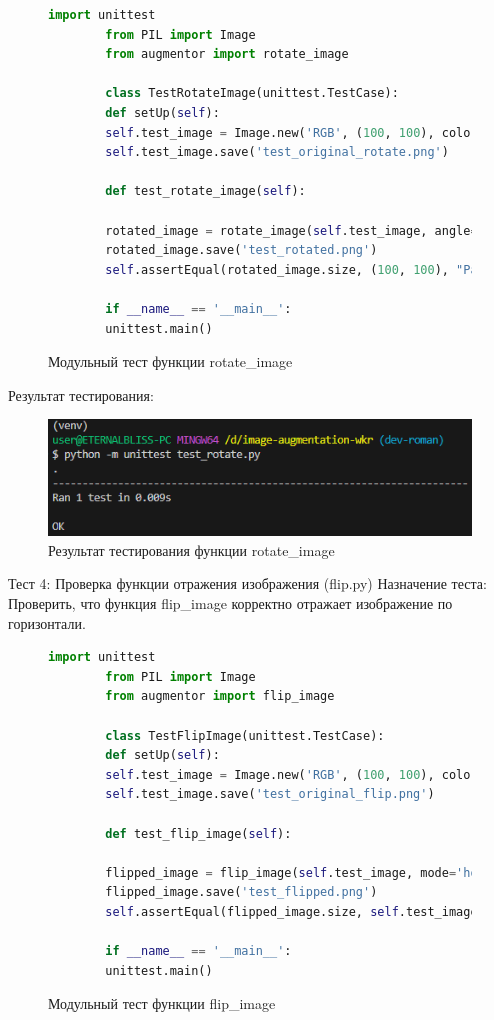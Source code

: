 \begin{figure}[H]
	\begin{lstlisting}[language=Python]
		import unittest
		from PIL import Image
		from augmentor import rotate_image
		
		class TestRotateImage(unittest.TestCase):
		def setUp(self):
		self.test_image = Image.new('RGB', (100, 100), color='white')
		self.test_image.save('test_original_rotate.png')
		
		def test_rotate_image(self):
		
		rotated_image = rotate_image(self.test_image, angle=90, target_size=(100, 100))
		rotated_image.save('test_rotated.png')
		self.assertEqual(rotated_image.size, (100, 100), "Размер изображения не соответствует target_size.")
		
		if __name__ == '__main__':
		unittest.main()
	\end{lstlisting}  
	\caption{Модульный тест функции rotate\_image}
	\label{model_test:test3}
\end{figure}

Результат тестирования:
\begin{figure}[H]
	\centering
	\includegraphics[width=0.7\linewidth]{images/resulttest3}
	\caption{Результат тестирования функции rotate\_image}
	\label{fig:resulttest3}
\end{figure}

Тест 4: Проверка функции отражения изображения (flip.py)
Назначение теста: Проверить, что функция flip\_image корректно отражает изображение по горизонтали.

\begin{figure}[H]
	\begin{lstlisting}[language=Python]
		import unittest
		from PIL import Image
		from augmentor import flip_image
		
		class TestFlipImage(unittest.TestCase):
		def setUp(self):
		self.test_image = Image.new('RGB', (100, 100), color='black')
		self.test_image.save('test_original_flip.png')
		
		def test_flip_image(self):
		
		flipped_image = flip_image(self.test_image, mode='horizontal')
		flipped_image.save('test_flipped.png')
		self.assertEqual(flipped_image.size, self.test_image.size, "Размеры изменились после отражения.")
		
		if __name__ == '__main__':
		unittest.main()
	\end{lstlisting}  
	\caption{Модульный тест функции flip\_image}
	\label{model_test:test4}
\end{figure}

